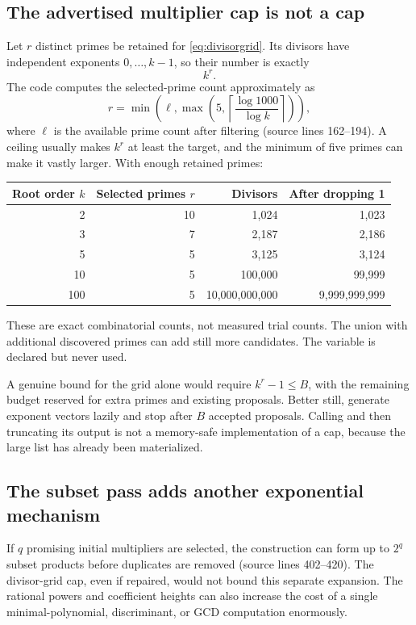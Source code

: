 \documentclass[11pt,letterpaper]{article}
\newcommand{\code}[1]{\texttt{\detokenize{#1}}}
\newcommand{\src}[1]{\textnormal{(source lines #1)}}
\theoremstyle{definition}
\begin{document}
\subsection{The advertised multiplier cap is not a cap}
Let $r$ distinct primes be retained for \eqref{eq:divisorgrid}. Its divisors have
independent exponents $0,\ldots,k-1$, so their number is exactly
\begin{equation}\label{eq:gridcount}
 k^r.
\end{equation}
The code computes the selected-prime count approximately as
\begin{equation}
 r=\min\!\left(\ell,\max\!\left(5,
 \left\lceil\frac{\log1000}{\log k}\right\rceil\right)\right),
\end{equation}
where $\ell$ is the available prime count after filtering \src{162--194}. A ceiling
usually makes $k^r$ at least the target, and the minimum of five primes can make it
vastly larger. With enough retained primes:
\begin{center}
\begin{tabular}{@{}rrrr@{}}
\toprule
Root order $k$ & Selected primes $r$ & Divisors & After dropping 1\\\midrule
2 & 10 & 1,024 & 1,023\\
3 & 7 & 2,187 & 2,186\\
5 & 5 & 3,125 & 3,124\\
10 & 5 & 100,000 & 99,999\\
100 & 5 & 10,000,000,000 & 9,999,999,999\\
\bottomrule
\end{tabular}
\end{center}
These are exact combinatorial counts, not measured trial counts. The union with
additional discovered primes can add still more candidates. The variable
\code{maxprimes = 14} is declared but never used.

A genuine bound for the grid alone would require $k^r-1\le B$, with the remaining
budget reserved for extra primes and existing proposals. Better still, generate
exponent vectors lazily and stop after $B$ accepted proposals. Calling
\code{Divisors} and then truncating its output is not a memory-safe implementation
of a cap, because the large list has already been materialized.

\subsection{The subset pass adds another exponential mechanism}
If $q$ promising initial multipliers are selected, the \code{Distribute} construction
can form up to $2^q$ subset products before duplicates are removed \src{402--420}.
The divisor-grid cap, even if repaired, would not bound this separate expansion.
The rational powers and coefficient heights can also increase the cost of a single
minimal-polynomial, discriminant, or GCD computation enormously.
\end{document}
